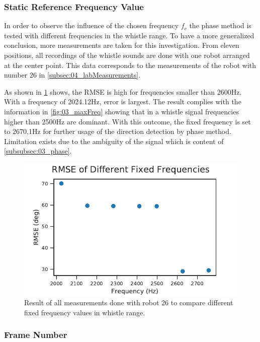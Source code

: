 \subsubsection*{Static Reference Frequency Value}
\label{subsubsec:04_fixedFrequencyVal}

In order to observe the influence of the chosen frequency $f_c$
the phase method is tested with different frequencies in the whistle range.
To have a more generalized conclusion, more measurements are taken for this
investigation.
From eleven positions, all recordings of the whistle sounds are done
with one robot arranged at the center point.
This data corresponds to the measurements of the robot with number 26
in \cref{subsec:04_labMeasurements}.

As shown in \cref{fig:04_diffFc} shows, the \ac{RMSE} is high for
frequencies smaller than 2600\si{\hertz}.
With a frequency of 2024.12\si{\hertz}, error is largest.
The result complies with the information in \cref{fig:03_maxFreq} showing that
in a whistle signal frequencies higher than 2500\si{\hertz} are dominant.
With this outcome, the fixed frequency is set to 2670,1\si{\hertz}
for further usage of the direction detection by phase method.
Limitation exists due to the ambiguity of the signal which is
content of \cref{subsubsec:03_phase}.
\begin{figure}[ht]
	\centering
		\includegraphics[]{figures/evaluation/phase_fc_rmse}
	\caption{Result of all measurements done with robot 26 to compare different
	fixed frequency values in whistle range.}
	\label{fig:04_diffFc}
\end{figure}
\subsubsection*{Frame Number}
\label{subsubsec:04_frameNumber}

